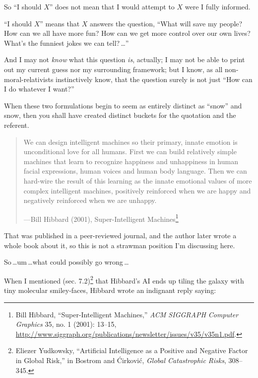  So ``I should $X$'' does not mean
that I would attempt to $X$ were I fully informed.


 ``I should $X$'' means that $X$
answers the question, ``What will save my people? How
can we all have more fun? How can we get more control over our own
lives? What's the funniest jokes we can tell?\,\ldots''


 And I may not \textit{know} what this question \textit{is},
actually; I may not be able to print out my current guess nor my
surrounding framework; but I know, as all non-moral-relativists
instinctively know, that the question surely is not just
``How can I do whatever I want?''


 When these two formulations begin to seem as entirely distinct as
``snow'' and snow, then you shall
have created distinct buckets for the quotation and the referent.

\myendsectiontext


\begin{quote}

 We can design intelligent machines so their primary, innate
emotion is unconditional love for all humans. First we can build
relatively simple machines that learn to recognize happiness and
unhappiness in human facial expressions, human voices and human body
language. Then we can hard-wire the result of this learning as the
innate emotional values of more complex intelligent machines,
positively reinforced when we are happy and negatively reinforced when
we are unhappy.

{\raggedleft
 {}---Bill Hibbard (2001), Super-Intelligent
Machines\footnote{Bill Hibbard, ``Super-Intelligent
Machines,'' \textit{ACM SIGGRAPH Computer Graphics}
35, no. 1 (2001): 13--15,
\url{http://www.siggraph.org/publications/newsletter/issues/v35/v35n1.pdf}.}
\par}
\end{quote}



 That was published in a peer-reviewed journal, and the author
later wrote a whole book about it, so this is not a strawman position
I'm discussing here.


 So\,\ldots um\,\ldots what could possibly go wrong\,\ldots


 When I mentioned (sec. 7.2)\footnote{Eliezer Yudkowsky, ``Artificial Intelligence
as a Positive and Negative Factor in Global Risk,''
in Bostrom and \'Cirkovi\'c, \textit{Global Catastrophic Risks},
308--345.} that
Hibbard's AI ends up tiling the galaxy with tiny
molecular smiley-faces, Hibbard wrote an indignant reply saying:


